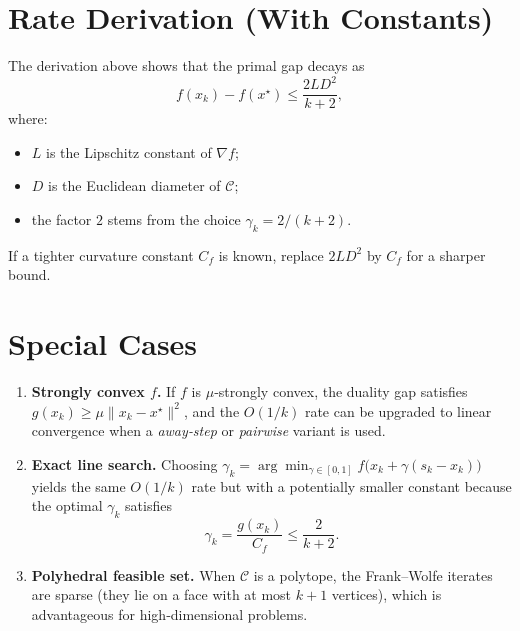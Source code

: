 \documentclass{article}
\begin{document}
\section*{Rate Derivation (With Constants)}
The derivation above shows that the primal gap decays as
\[
f(x_k)-f(x^\star) \le \frac{2L D^{2}}{k+2},
\]
where:
\begin{itemize}
\item $L$ is the Lipschitz constant of $\nabla f$;
\item $D$ is the Euclidean diameter of $\mathcal{C}$;
\item the factor $2$ stems from the choice $\gamma_k=2/(k+2)$.
\end{itemize}
If a tighter curvature constant $C_f$ is known, replace $2L D^{2}$ by $C_f$ for a sharper bound.

\section*{Special Cases}
\begin{enumerate}
\item \textbf{Strongly convex $f$.} If $f$ is $\mu$‑strongly convex, the duality gap satisfies $g(x_k)\ge \mu \|x_k-x^\star\|^{2}$, and the $O(1/k)$ rate can be upgraded to linear convergence when a \emph{away‑step} or \emph{pairwise} variant is used.
\item \textbf{Exact line search.} Choosing $\gamma_k = \arg\min_{\gamma\in[0,1]} f\bigl(x_k+\gamma(s_k-x_k)\bigr)$ yields the same $O(1/k)$ rate but with a potentially smaller constant because the optimal $\gamma_k$ satisfies
\[
\gamma_k = \frac{g(x_k)}{C_f}\le \frac{2}{k+2}.
\]
\item \textbf{Polyhedral feasible set.} When $\mathcal{C}$ is a polytope, the Frank–Wolfe iterates are sparse (they lie on a face with at most $k+1$ vertices), which is advantageous for high‑dimensional problems.
\end{enumerate}
\end{document}
